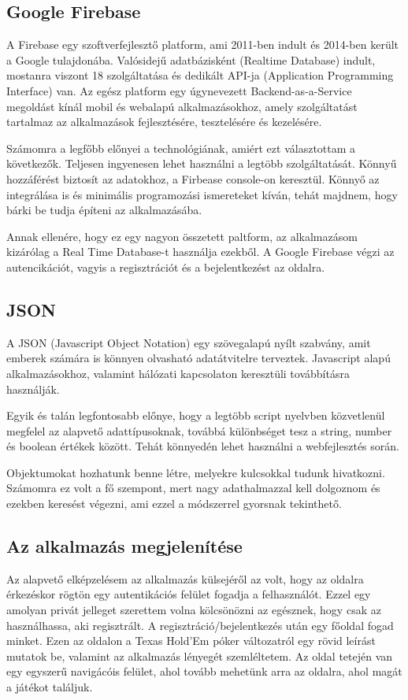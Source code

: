 \subsection{Google Firebase}
A Firebase egy szoftverfejlesztő platform, ami 2011-ben indult és 2014-ben került a Google tulajdonába. Valósidejű adatbázisként (Realtime Database) indult, mostanra viszont 18 szolgáltatása és dedikált API-ja (Application Programming Interface) van. Az egész platform egy úgynevezett Backend-as-a-Service megoldást kínál mobil és webalapú alkalmazásokhoz, amely szolgáltatást tartalmaz az alkalmazások fejlesztésére, tesztelésére és kezelésére. 

Számomra a legfőbb előnyei a technológiának, amiért ezt választottam a következők. Teljesen ingyenesen lehet használni a legtöbb szolgáltatását. Könnyű hozzáférést biztosít az adatokhoz, a Firbease console-on keresztül. Könnyő az integrálása is és minimális programozási ismereteket kíván, tehát majdnem, hogy bárki be tudja építeni az alkalmazásába.

Annak ellenére, hogy ez egy nagyon összetett paltform, az alkalmazásom kizárólag a Real Time Database-t használja ezekből. A Google Firebase végzi az autencikációt, vagyis a regisztrációt és a bejelentkezést az oldalra.
\cite{firebase}

\subsection{JSON}
A JSON (Javascript Object Notation) egy szövegalapú nyílt szabvány, amit emberek számára is könnyen olvasható adatátvitelre terveztek. Javascript alapú alkalmazásokhoz, valamint hálózati kapcsolaton keresztüli továbbításra használják. 

Egyik és talán legfontosabb előnye, hogy a legtöbb script nyelvben közvetlenül megfelel az alapvető adattípusoknak, továbbá különbséget tesz a string, number és boolean értékek között. Tehát könnyedén lehet használni a webfejlesztés során. 

Objektumokat hozhatunk benne létre, melyekre kulcsokkal tudunk hivatkozni. Számomra ez volt a fő szempont, mert nagy adathalmazzal kell dolgoznom és ezekben keresést végezni, ami ezzel a módszerrel gyorsnak tekinthető.


\subsection{Az alkalmazás megjelenítése}
Az alapvető elképzelésem az alkalmazás külsejéről az volt, hogy az oldalra érkezéskor rögtön egy autentikációs felület fogadja a felhasználót. Ezzel egy amolyan privát jelleget szerettem volna kölcsönözni az egésznek, hogy csak az használhassa, aki regisztrált. A regisztráció/bejelentkezés után egy főoldal fogad minket. Ezen az oldalon a Texas Hold'Em póker változatról egy rövid leírást mutatok be, valamint az alkalmazás lényegét szemléltetem. Az oldal tetején van egy egyszerű navigácóis felület, ahol tovább mehetünk arra az oldalra, ahol magát a játékot találjuk.

